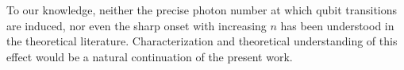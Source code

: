 %
%

To our knowledge, neither the precise photon number at which qubit transitions are induced, nor even the sharp onset with increasing $n$ has been understood in the theoretical literature.
Characterization and theoretical understanding of this effect would be a natural continuation of the present work.
